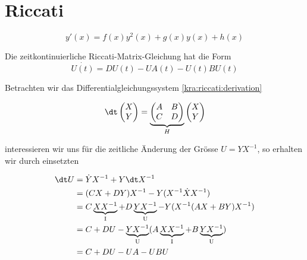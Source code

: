 \section{Riccati
  \label{kra:section:riccati}}

\begin{equation}
    y'(x) = f(x)y^2(x) + g(x)y(x) + h(x)
\end{equation}


Die zeitkontinuierliche Riccati-Matrix-Gleichung hat die Form
\begin{equation}
    \label{kra:riccati:riccatiequation}
    \dot{U(t)} = DU(t) - UA(t) - U(t)BU(t)
\end{equation}

Betrachten wir das Differentialgleichungssystem \ref{kra:riccati:derivation}

\begin{equation}
    \label{kra:riccati:derivation}
    \dt
    \begin{pmatrix}
        X \\
        Y
    \end{pmatrix}
    =
    \underbrace{
        \begin{pmatrix}
            A & B \\
            C & D
        \end{pmatrix}
    }_{H}
    \begin{pmatrix}
        X \\
        Y
    \end{pmatrix}
\end{equation}

interessieren wir uns für die zeitliche Änderung der Grösse $U = YX^{-1}$, so erhalten wir durch einsetzten

\begin{align*}
    \dt U & = \dot{Y} X^{-1} + Y \dt X^{-1}                                                                           \\
          & = (CX + DY) X^{-1} - Y (X^{-1} \dot{X} X^{-1})                                                            \\
          & = C\underbrace{XX^{-1}}_\text{I} + D\underbrace{YX^{-1}}_\text{U} - Y(X^{-1} (AX + BY) X^{-1})            \\
          & = C + DU - \underbrace{YX^{-1}}_\text{U}(A\underbrace{XX^{-1}}_\text{I} + B\underbrace{YX^{-1}}_\text{U}) \\
          & = C  + DU - UA - UBU
\end{align*}

